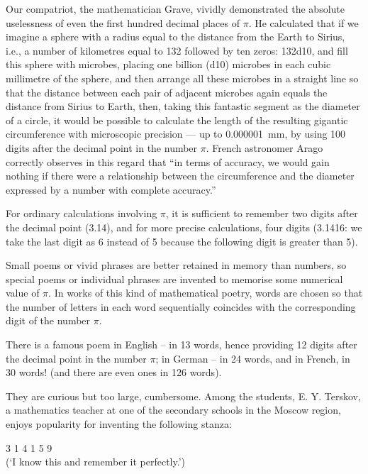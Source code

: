 Our compatriot, the mathematician Grave, vividly demonstrated the absolute uselessness of even the first hundred decimal places of $\pi$. He calculated that if we imagine a sphere with a radius equal to the distance from the Earth to Sirius, i.e., a number of kilometres equal to 132 followed by ten zeros: \num{132d10}, and fill this sphere with microbes, placing one billion (\num{d10}) microbes in each cubic millimetre of the sphere, and then arrange all these microbes in a straight line so that the distance between each pair of adjacent microbes again equals the distance from Sirius to Earth, then, taking this fantastic segment as the diameter of a circle, it would be possible to calculate the length of the resulting gigantic circumference with microscopic precision — up to \SI{0.000001}{\milli\metre}, by using 100 digits after the decimal point in the number $\pi$. French astronomer Arago correctly observes in this regard that ``in terms of accuracy, we would gain nothing if there were a relationship between the circumference and the diameter expressed by a number with complete accuracy.''

For ordinary calculations involving $\pi$, it is sufficient to remember two digits after the decimal point (3.14), and for more precise calculations, four digits (3.1416: we take the last digit as 6 instead of 5 because the following digit is greater than 5).

Small poems or vivid phrases are better retained in memory than numbers, so special poems or individual phrases are invented to memorise some numerical value of $\pi$. In works of this kind of mathematical poetry, words are chosen so that the number of letters in each word sequentially coincides with the corresponding digit of the number $\pi$.

There is a famous poem in English -- in 13 words, hence providing 12 digits after the decimal point in the number $\pi$; in German -- in 24 words, and in French, in 30 words! (and there are even ones in 126 words).

They are curious but too large, cumbersome. Among the students, E. Y. Terskov, a mathematics teacher at one of the secondary schools in the Moscow region, enjoys popularity for inventing the following stanza:

{3 1 4 1 5 9} \\
(`I know this and remember it perfectly.')

